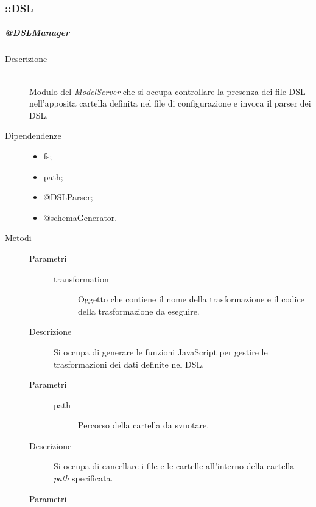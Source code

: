 \subsubsection{::DSL}
\subparagraph{@DSLManager}
\begin{description}
 \item[Descrizione] \hfill \\
  Modulo del \textit{ModelServer} che si occupa controllare la presenza dei file DSL nell'apposita cartella definita nel file di configurazione e invoca il parser dei DSL.
 \item[Dipendendenze] \hfill 
 \begin{itemize}
 \item{fs};
  \item{path};
  \item{@DSLParser};
  \item{@schemaGenerator}.
 \end{itemize} 
 \item[Metodi]
 \begin{mldescription}
  \hfill 
  	\begin{description}
   		\item[Parametri] \hfill
   			\begin{description}
   				\item[transformation]
   				Oggetto che contiene il nome della trasformazione e il codice della trasformazione da eseguire.
   			\end{description}
   		\item[Descrizione]
   		Si occupa di generare le funzioni JavaScript per gestire le trasformazioni dei dati definite nel DSL.
   	\end{description}
  \hfill 
   	\begin{description}
    		\item[Parametri] \hfill
    			\begin{description}
    				\item[path]
    				Percorso della cartella da svuotare.
    			\end{description}
    		\item[Descrizione]
    		Si occupa di cancellare i file e le cartelle all'interno della cartella \textit{path} specificata.
    	\end{description}
  \hfill 
 	\begin{description}
    		\item[Parametri] \hfill

\end{description}
\end{mldescription}
\end{description}
